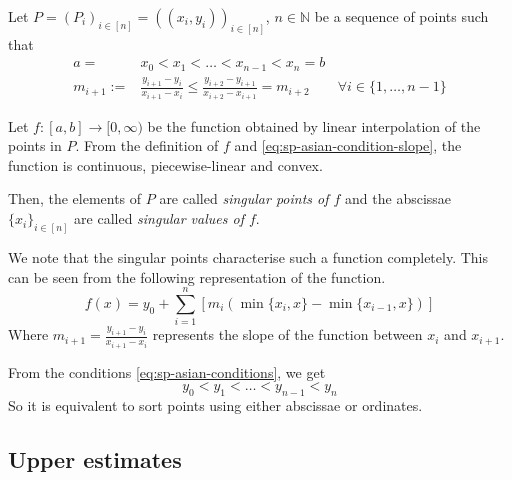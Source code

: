 \begin{dfn} \label{def:sp-asian-sp}
	Let $ P = (P_i)_{i \in [n]} = ( (x_i, y_i) )_{i \in [n]} $, $ n \in \mathbb{N} $ be a sequence of points such that
	\begin{subequations} \label{eq:sp-asian-conditions}
		\begin{align}
			a =& x_0 < x_1 < \dots < x_{n-1} < x_n = b \\
			\label{eq:sp-asian-condition-slope}
			m_{i+1} :=& \frac{y_{i+1} - y_{i}}{x_{i+1} - x_{i}} \le \frac{y_{i+2} - y_{i+1}}{x_{i+2} - x_{i+1}} = m_{i+2} \qquad \forall i \in \{ 1, \dots, n-1 \}
		\end{align}
	\end{subequations}
	
	Let $ f:[a,b] \to [0, \infty) $ be the function obtained by linear interpolation of the points in $P$. From the definition of $f$ and	 \ref{eq:sp-asian-condition-slope}, the function is continuous, piecewise-linear and convex.
	
	Then, the elements of $P$ are called \emph{singular points of $f$} and the abscissae $ \{ x_i \}_{i \in [n]} $ are called \emph{singular values of $f$}.
\end{dfn}


\begin{rem}
	\label{rem:sp-asian-char}
	We note that the singular points characterise such a function completely. This can be seen from the following representation of the function.
	\begin{equation}
		\label{eq:sp-asian-function-repr}
		f(x) = y_0 + \sum_{i=1}^n [ m_i ( \min \{x_{i}, x \} - \min \{ x_{i-1}, x \} ) ]
	\end{equation}
	Where $ m_{i+1} = \frac{y_{i+1} - y_{i}}{x_{i+1} - x_{i}} $ represents the slope of the function between $ x_{i} $ and $ x_{i+1} $.
\end{rem}

\begin{rem}
	From the conditions \ref{eq:sp-asian-conditions}, we get
	\begin{equation*}
		y_0 < y_1 < \dots < y_{n-1} < y_n
	\end{equation*}
	So it is equivalent to sort points using either abscissae or ordinates.
\end{rem}



\subsection{Upper estimates}
\label{subsec:sp-asian-upper-estimates}

